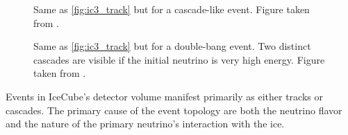 \begin{figure}
    \caption{Same as \cref{fig:ic3_track} but for a cascade-like event. Figure taken from \cite{IC3_masterclass}.}
    \label{fig:ic3_cascade}
\end{figure}

\begin{figure}
    \caption{Same as \cref{fig:ic3_track} but for a double-bang event. Two distinct cascades are visible if the initial neutrino is very high energy. Figure taken from \cite{IC3_masterclass}.}
    \label{fig:ic3_doubleBang}
\end{figure}

Events in IceCube's detector volume manifest primarily as either tracks or cascades.
The primary cause of the event topology are both the neutrino flavor and the nature of the primary neutrino's interaction with the ice.

